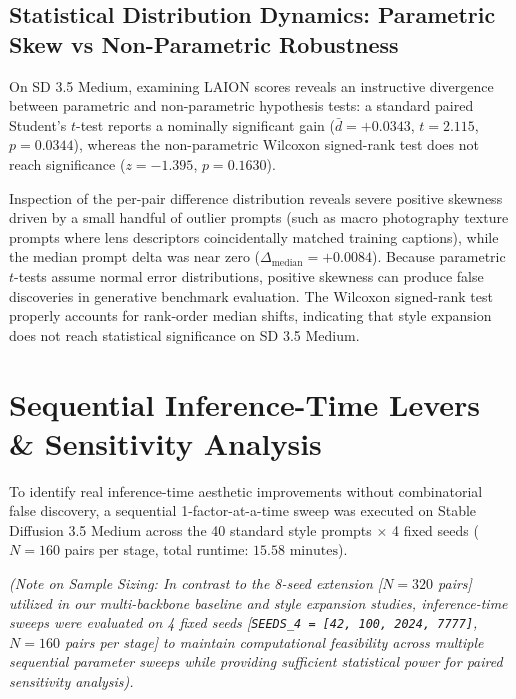 \documentclass[10pt,twocolumn,letterpaper]{article}
\begin{document}
\subsection{Statistical Distribution Dynamics: Parametric Skew vs Non-Parametric Robustness}
On SD 3.5 Medium, examining LAION scores reveals an instructive divergence between parametric and non-parametric hypothesis tests: a standard paired Student's $t$-test reports a nominally significant gain ($\bar{d} = +0.0343$, $t = 2.115$, $p = 0.0344$), whereas the non-parametric Wilcoxon signed-rank test does not reach significance ($z = -1.395$, $p = 0.1630$).

Inspection of the per-pair difference distribution reveals severe positive skewness driven by a small handful of outlier prompts (such as macro photography texture prompts where lens descriptors coincidentally matched training captions), while the median prompt delta was near zero ($\Delta_{\text{median}} = +0.0084$). Because parametric $t$-tests assume normal error distributions, positive skewness can produce false discoveries in generative benchmark evaluation. The Wilcoxon signed-rank test properly accounts for rank-order median shifts, indicating that style expansion does not reach statistical significance on SD 3.5 Medium.

\section{Sequential Inference-Time Levers \& Sensitivity Analysis}

To identify real inference-time aesthetic improvements without combinatorial false discovery, a sequential 1-factor-at-a-time sweep was executed on Stable Diffusion 3.5 Medium across the 40 standard style prompts $\times$ 4 fixed seeds ($N=160$ pairs per stage, total runtime: $15.58\text{ minutes}$).

\textit{(Note on Sample Sizing: In contrast to the 8-seed extension [$N = 320$ pairs] utilized in our multi-backbone baseline and style expansion studies, inference-time sweeps were evaluated on 4 fixed seeds [\texttt{SEEDS\_4 = [42, 100, 2024, 7777]}, $N = 160$ pairs per stage] to maintain computational feasibility across multiple sequential parameter sweeps while providing sufficient statistical power for paired sensitivity analysis).}
\end{document}
